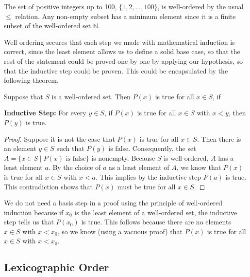 \begin{example}
	The set of positive integers up to 100, \( \{1, 2, \ldots, 100\} \), is well-ordered by the usual \( \leq \) relation. Any non-empty subset has a minimum element since it is a finite subset of the well-ordered set \( \mathbb{N} \).
\end{example}

Well ordering secures that each step we made with mathematical induction is correct, since the least element allows us to define a solid base case, so that the rest of the statement could be proved one by one by applying our hypothesis, so that the inductive step could be proven. This could be encapsulated by the following theorem.
\begin{theorem}
	Suppose that \( S \) is a well-ordered set. Then \( P(x) \) is true for all \( x \in S \), if

		\textbf{Inductive Step:} For every \( y \in S \), if \( P(x) \) is true for all \( x \in S \) with \( x < y \), then \( P(y) \) is true.

\end{theorem}

\begin{proof}
	Suppose it is not the case that \( P(x) \) is true for all \( x \in S \). Then there is an element \( y \in S \) such that \( P(y) \) is false. Consequently, the set \( A = \{ x \in S \mid P(x) \text{ is false} \} \) is nonempty. Because \( S \) is well-ordered, \( A \) has a least element \( a \). By the choice of \( a \) as a least element of \( A \), we know that \( P(x) \) is true for all \( x \in S \) with \( x < a \). This implies by the inductive step \( P(a) \) is true. This contradiction shows that \( P(x) \) must be true for all \( x \in S \).
\end{proof}

\begin{remark}
	We do not need a basis step in a proof using the principle of well-ordered induction because if \( x_0 \) is the least element of a well-ordered set, the inductive step tells us that \( P(x_0) \) is true. This follows because there are no elements \( x \in S \) with \( x < x_0 \), so we know (using a vacuous proof) that \( P(x) \) is true for all \( x \in S \) with \( x < x_0 \).
\end{remark}

\subsection{Lexicographic Order}




